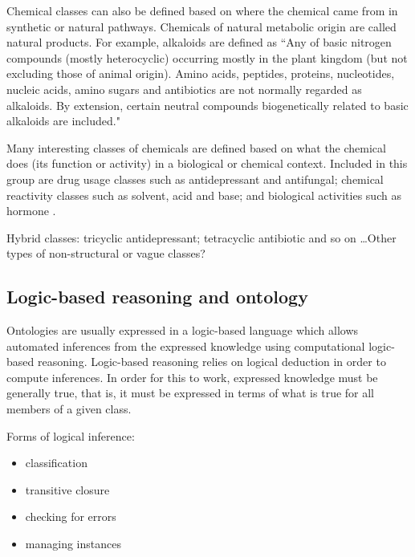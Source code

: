 \documentclass[10pt]{bmc_article}
\newenvironment{bmcformat}{\baselineskip20pt\sloppy\setboolean{publ}{false}}{\baselineskip20pt\sloppy}
\begin{document}
\begin{bmcformat}
Chemical classes can also be defined based on where the chemical came from in synthetic or natural pathways. Chemicals of natural metabolic origin are called natural products.  For example, alkaloids are defined as ``Any of basic nitrogen compounds (mostly heterocyclic) occurring mostly in the plant kingdom (but not excluding those of animal origin). Amino acids, peptides, proteins, nucleotides, nucleic acids, amino sugars and antibiotics are not normally regarded as alkaloids. By extension, certain neutral compounds biogenetically related to basic alkaloids are included."

Many interesting classes of chemicals are defined based on what the chemical does (its function or activity) in a biological or chemical context. Included in this group are drug usage classes such as antidepressant and antifungal; chemical reactivity classes such as solvent, acid and base; and biological activities such as hormone \cite{batchelor2010}. 


Hybrid classes:  tricyclic antidepressant; tetracyclic antibiotic and so on \ldots  Other types of non-structural or vague classes? 


\subsection*{Logic-based reasoning and ontology}
\label{sec:backlogic}

 
Ontologies are usually expressed in a logic-based language which allows automated inferences from the expressed knowledge using computational logic-based reasoning.  Logic-based reasoning relies on logical deduction in order to compute inferences.  In order for this to work, expressed knowledge must be generally true, that is, it must be expressed in terms of what is true for all members of a given class. 

Forms of logical inference: 
\begin{itemize}
	\item  classification
	\item  transitive closure
	\item  checking for errors
	\item  managing instances
\end{itemize}


\end{bmcformat}
\end{document}
